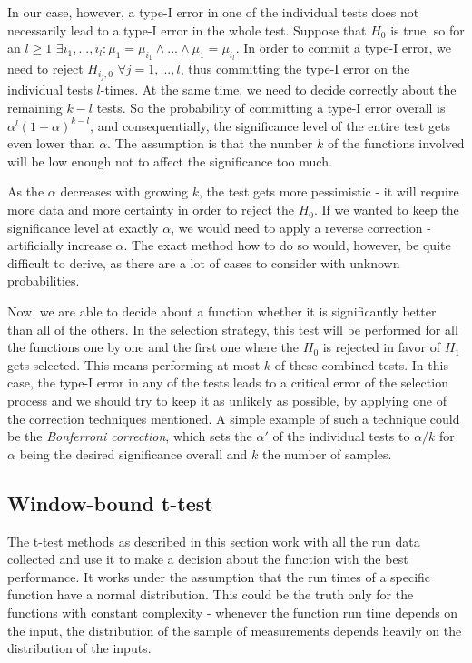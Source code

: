 In our case, however, a type-I error in one of the individual tests does not necessarily lead to a type-I error in the whole test. Suppose that $H_0$ is true, so for an $l \geq 1$ $\exists i_1,...,i_l: \mu_1 = \mu_{i_1} \wedge ... \wedge \mu_1 = \mu_{i_l}$. In order to commit a type-I error, we need to reject $H_{i_j,0}$ $\forall j = 1, ..., l$, thus committing the type-I error on the individual tests $l$-times. At the same time, we need to decide correctly about the remaining $k-l$ tests. So the probability of committing a type-I error overall is $\alpha^l(1-\alpha)^{k-l}$, and consequentially, the significance level of the entire test gets even lower than $\alpha$. The assumption is that the number $k$ of the functions involved will be low enough not to affect the significance too much. 

As the $\alpha$ decreases with growing $k$, the test gets more pessimistic - it will require more data and more certainty in order to reject the $H_0$. If we wanted to keep the significance level at exactly $\alpha$, we would need to apply a reverse correction - artificially increase $\alpha$. The exact method how to do so would, however, be quite difficult to derive, as there are a lot of cases to consider with unknown probabilities. 

Now, we are able to decide about a function whether it is significantly better than all of the others. In the selection strategy, this test will be performed for all the functions one by one and the first one where the $H_0$ is rejected in favor of $H_1$ gets selected. This means performing at most $k$ of these combined tests. In this case, the type-I error in any of the tests leads to a critical error of the selection process and we should try to keep it as unlikely as possible, by applying one of the correction techniques mentioned. A simple example of such a technique could be the \textit{Bonferroni correction}, which sets the $\alpha'$ of the individual tests to $\alpha / k$ for $\alpha$ being the desired significance overall and $k$ the number of samples.

\subsection{Window-bound t-test}

The t-test methods as described in this section work with all the run data collected and use it to make a decision about the function with the best performance. It works under the assumption that the run times of a specific function have a normal distribution. This could be the truth only for the functions with constant complexity - whenever the function run time depends on the input, the distribution of the sample of measurements depends heavily on the distribution of the inputs.

